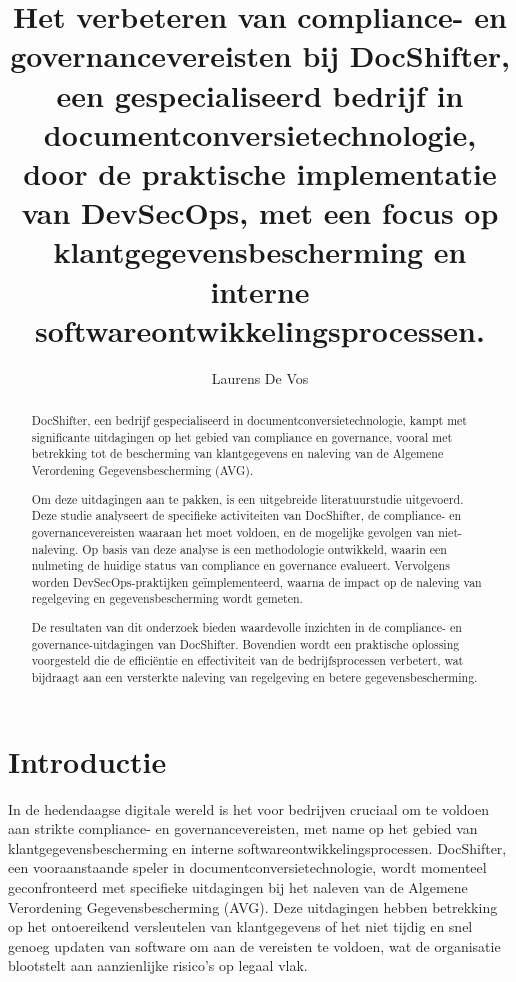 \documentclass{hogent-article}
\title{Het verbeteren van compliance- en governancevereisten bij DocShifter, een gespecialiseerd bedrijf in documentconversietechnologie, door de praktische implementatie van DevSecOps, met een focus op klantgegevensbescherming en interne softwareontwikkelingsprocessen.}
\author{Laurens De Vos}
\begin{document}
    
    \begin{abstract}
    
    DocShifter, een bedrijf gespecialiseerd in documentconversietechnologie, kampt met significante uitdagingen op het gebied van compliance en governance, vooral met betrekking tot de bescherming van klantgegevens en naleving van de Algemene Verordening Gegevensbescherming (AVG).
    
    Om deze uitdagingen aan te pakken, is een uitgebreide literatuurstudie uitgevoerd. Deze studie analyseert de specifieke activiteiten van DocShifter, de compliance- en governancevereisten waaraan het moet voldoen, en de mogelijke gevolgen van niet-naleving. Op basis van deze analyse is een methodologie ontwikkeld, waarin een nulmeting de huidige status van compliance en governance evalueert. Vervolgens worden DevSecOps-praktijken geïmplementeerd, waarna de impact op de naleving van regelgeving en gegevensbescherming wordt gemeten.
    
    De resultaten van dit onderzoek bieden waardevolle inzichten in de compliance- en governance-uitdagingen van DocShifter. Bovendien wordt een praktische oplossing voorgesteld die de efficiëntie en effectiviteit van de bedrijfsprocessen verbetert, wat bijdraagt aan een versterkte naleving van regelgeving en betere gegevensbescherming.
    
    
    \end{abstract}
    
    \tableofcontents
    
    
    \section{Introductie}%
    \label{sec:introductie}

    In de hedendaagse digitale wereld is het voor bedrijven cruciaal om te voldoen aan strikte compliance- en governancevereisten, met name op het gebied van klantgegevensbescherming en interne softwareontwikkelingsprocessen. DocShifter, een vooraanstaande speler in documentconversietechnologie, wordt momenteel geconfronteerd met specifieke uitdagingen bij het naleven van de Algemene Verordening Gegevensbescherming (AVG). Deze uitdagingen hebben betrekking op het ontoereikend versleutelen van klantgegevens of het niet tijdig en snel genoeg updaten van software om aan de vereisten te voldoen, wat de organisatie blootstelt aan aanzienlijke risico's op legaal vlak.
    
\end{document}

